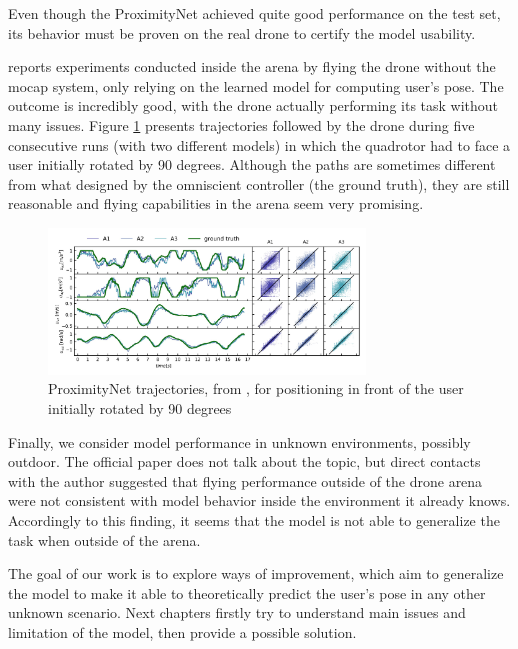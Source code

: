 Even though the ProximityNet achieved quite good performance on the test set, its behavior must be proven on the real drone to certify the model usability.

\cite{mantegazza2019visionbased} reports experiments conducted inside the arena by flying the drone without the \gls{mocap} system, only relying on the learned model for computing user's pose. The outcome is incredibly good, with the drone actually performing its task without many issues. Figure \ref{fig:proximitynet-trajectories} presents trajectories followed by the drone during five consecutive runs (with two different models) in which the quadrotor had to face a user initially rotated by 90 degrees. Although the paths are sometimes different from what designed by the omniscient controller (the ground truth), they are still reasonable and flying capabilities in the arena seem very promising.

\begin{figure}[!htb]
	\centering
	\includegraphics[width=0.75\textwidth]{"contents/images/03-proximitynet-gt-pred"}
	\caption[ProximityNet trajectories, from \cite{mantegazza2019visionbased}, for positioning in front of the user initially rotated by 90 degrees]{ProximityNet trajectories, from \cite{mantegazza2019visionbased}, for positioning in front of the user initially rotated by 90 degrees}
	\label{fig:proximitynet-trajectories}
\end{figure}

\medskip

Finally, we consider model performance in unknown environments, possibly outdoor. The official paper does not talk about the topic, but direct contacts with the author suggested that flying performance outside of the drone arena were not consistent with model behavior inside the environment it already knows. Accordingly to this finding, it seems that the model is not able to generalize the task when outside of the arena.

\bigskip

The goal of our work is to explore ways of improvement, which aim to generalize the model to make it able to theoretically predict the user's pose in any other unknown scenario. Next chapters firstly try to understand main issues and limitation of the model, then provide a possible solution.




